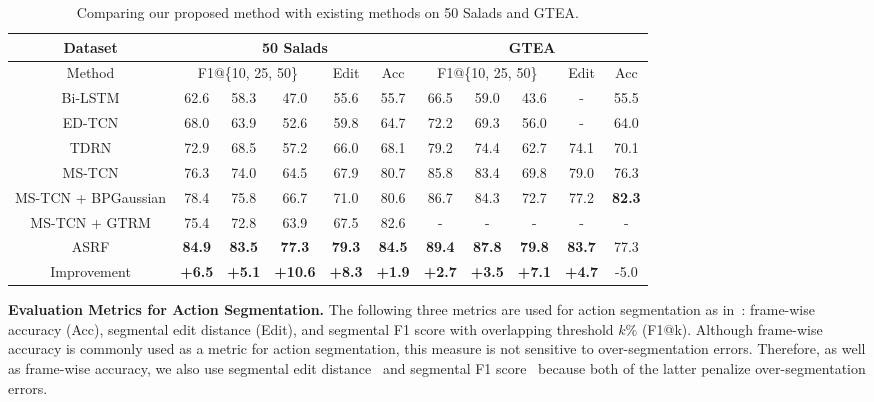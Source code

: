 \documentclass[10pt,twocolumn,letterpaper]{article}
\begin{document}
\begin{table*}[t!]
\small
\centering
\begin{tabular}{c | ccccc |ccccc }
\hline
Dataset             & \multicolumn{5}{c}{50 Salads}                        & \multicolumn{5}{c}{GTEA}                            \\ \hline
Method               & \multicolumn{3}{c}{F1@\{10, 25, 50\}} & Edit & Acc  & \multicolumn{3}{c}{F1@\{10, 25, 50\}} & Edit  & Acc  \\ \hline
Bi-LSTM \cite{bi-lstm2}       & 62.6   & 58.3   & 47.0   & 55.6   & 55.7                              & 66.5   & 59.0   & 43.6   & -      & 55.5            \\ 
ED-TCN \cite{tcn}             & 68.0   & 63.9   & 52.6   & 59.8   & 64.7                              & 72.2   & 69.3   & 56.0   & -      & 64.0            \\ 
TDRN \cite{deform}            & 72.9   & 68.5   & 57.2   & 66.0   & 68.1                              & 79.2   & 74.4   & 62.7   & 74.1   & 70.1            \\ 
MS-TCN \cite{tcn}             & 76.3   & 74.0   & 64.5   & 67.9   & 80.7                              & 85.8   & 83.4   & 69.8   & 79.0   & 76.3            \\ 
MS-TCN + BPGaussian \cite{bpgaussian}  & 78.4   & 75.8   & 66.7   & 71.0   & 80.6                     & 86.7   & 84.3   & 72.7   & 77.2   & \textbf{82.3}  \\
MS-TCN + GTRM \cite{as_graph} & 75.4   & 72.8   & 63.9   & 67.5   & 82.6                              & -      & -      & -      & -      & -               \\ \hline
ASRF                          & \textbf{84.9} & \textbf{83.5} & \textbf{77.3} & \textbf{79.3} & \textbf{84.5}    & \textbf{89.4} & \textbf{87.8} & \textbf{79.8} & \textbf{83.7} & 77.3  \\
\rowcolor[gray]{0.90}
Improvement                   & \textbf{+6.5}    & \textbf{+5.1}    & \textbf{+10.6}   & \textbf{+8.3}    & \textbf{+1.9}   & \textbf{+2.7}    & \textbf{+3.5}    & \textbf{+7.1}    & \textbf{+4.7}    & -5.0 \\ \hline
\end{tabular}
\caption{Comparing our proposed method with existing methods on 50 Salads and GTEA.}
\label{tab:50salads gtea}
\end{table*}

\textbf{Evaluation Metrics for Action Segmentation.}
The following three metrics are used for action segmentation as in~\cite{icra,markov2,tcn}: frame-wise accuracy (Acc), segmental edit distance (Edit), and segmental F1 score with overlapping threshold $k\%$ (F1@k). 
Although frame-wise accuracy is commonly used as a metric for action segmentation, this measure is not sensitive to over-segmentation errors.
Therefore, as well as frame-wise accuracy, we also use segmental edit distance~\cite{icra,markov2} and segmental F1 score~\cite{tcn} because both of the latter penalize over-segmentation errors.
\end{document}

